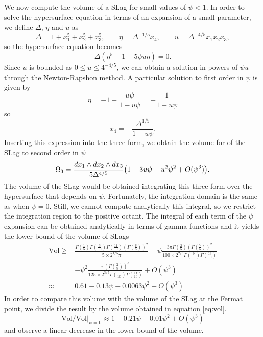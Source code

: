 We now compute the volume of a SLag for small values of $\psi<1$.
In order to solve the hypersurface equation in terms of an expansion of a small parameter, 
we define $\Delta$, $\eta$ and $u$ as
\begin{equation}
\Delta = 1 + x_1^5 + x_2^5 +x_3^5, \qquad \eta = \Delta^{-1/5} x_4, \qquad u = \Delta^{-4/5} x_1 x_2 x_3,
\end{equation}
so the hypersurface equation becomes
\begin{equation}
  \Delta (\eta^5+1-5\psi u\eta)=0.
\end{equation}
Since $u$ is bounded as $0\leq u \leq 4^{-4/5}$, we can obtain a solution in powers of
$\psi u$ through the Newton-Rapshon method.
A particular solution to first order in $\psi$ is given by
\begin{equation}
  \eta=-1-\frac{u\psi}{1-u\psi}=-\frac{1}{1-u\psi}
\end{equation}
so 
\begin{equation}
  x_4=-\frac{\Delta^{1/5}}{1-u\psi}.
\end{equation}
Inserting this expression into the three-form, we obtain the volume for of
the SLag to second order in $\psi$ 
\begin{equation}
  \Omega_3=\frac{dx_1\wedge dx_2\wedge dx_3}{5\Delta^{4/5}}\qty(1-3u\psi-u^2\psi^2+O(\psi^3)).
\end{equation}
The volume of the SLag would be obtained integrating this three-form over the hypersurface that depends on $\psi$.
Fortunately, the integration domain is the same as when $\psi=0$.
Still, we cannot compute analytically this integral, so we restrict the integration region to
the positive octant.
The integral of each term of the $\psi$ expansion can be obtained analytically in terms of gamma functions
and it yields the lower bound of the volume of SLags
\begin{align}
  \mathrm{Vol}\geq&
\frac{\Gamma\left(\frac{1}{5} \right) \Gamma\left(\frac{3}{10}\right)  \Gamma\left(\frac{11}{10}\right)  (\Gamma\left(\frac{6}{5} \right))^2}{5 \times 2^{1/5} \pi} 
  -  \psi  \frac{3 \pi \Gamma\left( \frac{2}{5}\right) (\Gamma\left( \frac{7}{5}\right))^2}{100 \times 2^{2/5} \Gamma\left( \frac{9}{10} \right) \Gamma(\frac{13}{10})} \\
  &-  \psi^2 \frac{\pi (\Gamma\left( \frac{3}{5}\right))^3}{125 \times 2^{3/5} \Gamma\left( \frac{1}{10} \right) \Gamma\left( \frac{17}{10} \right)} + O(\psi^3)\\
 \approx& 0.61-0.13\psi-0.0063\psi^2+O(\psi^3)
\end{align}
In order to compare this volume with the volume of the SLag at the Fermat point, we divide
the result by the volume obtained in equation \eqref{eq:vol}.
\begin{equation}
  \mathrm{Vol}/\mathrm{Vol}|_{\psi=0} \approx 1 - 0.21\psi - 0.01\psi^2 + O(\psi^3)
\end{equation}
and observe a linear decrease in the lower bound of the volume.
